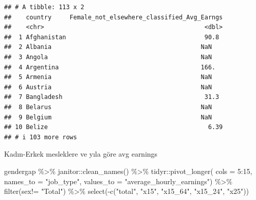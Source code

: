 \documentclass[
]{article}
\newenvironment{Shaded}{\begin{snugshade}}{\end{snugshade}}
\newcommand{\AttributeTok}[1]{\textcolor[rgb]{0.77,0.63,0.00}{#1}}
\newcommand{\DecValTok}[1]{\textcolor[rgb]{0.00,0.00,0.81}{#1}}
\newcommand{\FunctionTok}[1]{\textcolor[rgb]{0.00,0.00,0.00}{#1}}
\newcommand{\NormalTok}[1]{#1}
\newcommand{\SpecialCharTok}[1]{\textcolor[rgb]{0.00,0.00,0.00}{#1}}
\newcommand{\StringTok}[1]{\textcolor[rgb]{0.31,0.60,0.02}{#1}}
\begin{document}
\begin{verbatim}
## # A tibble: 113 x 2
##    country     Female_not_elsewhere_classified_Avg_Earngs
##    <chr>                                            <dbl>
##  1 Afghanistan                                      90.8 
##  2 Albania                                         NaN   
##  3 Angola                                          NaN   
##  4 Argentina                                       166.  
##  5 Armenia                                         NaN   
##  6 Austria                                         NaN   
##  7 Bangladesh                                       31.3 
##  8 Belarus                                         NaN   
##  9 Belgium                                         NaN   
## 10 Belize                                            6.39
## # i 103 more rows
\end{verbatim}

Kadın-Erkek mesleklere ve yıla göre avg earnings

\begin{Shaded}
\begin{Highlighting}[]
\NormalTok{gendergap }\SpecialCharTok{\%\textgreater{}\%}
\NormalTok{  janitor}\SpecialCharTok{::}\FunctionTok{clean\_names}\NormalTok{() }\SpecialCharTok{\%\textgreater{}\%}
\NormalTok{tidyr}\SpecialCharTok{::}\FunctionTok{pivot\_longer}\NormalTok{( }\AttributeTok{cols =} \DecValTok{5}\SpecialCharTok{:}\DecValTok{15}\NormalTok{,}
             \AttributeTok{names\_to =} \StringTok{"job\_type"}\NormalTok{,}
             \AttributeTok{values\_to =} \StringTok{"average\_hourly\_earnings"}\NormalTok{) }\SpecialCharTok{\%\textgreater{}\%}
\FunctionTok{filter}\NormalTok{(sex}\SpecialCharTok{!=} \StringTok{"Total"}\NormalTok{) }\SpecialCharTok{\%\textgreater{}\%}
\FunctionTok{select}\NormalTok{(}\SpecialCharTok{{-}}\FunctionTok{c}\NormalTok{(}\StringTok{"total"}\NormalTok{, }\StringTok{"x15"}\NormalTok{, }\StringTok{"x15\_64"}\NormalTok{, }\StringTok{"x15\_24"}\NormalTok{, }\StringTok{"x25"}\NormalTok{))}
\end{Highlighting}
\end{Shaded}
\end{document}
